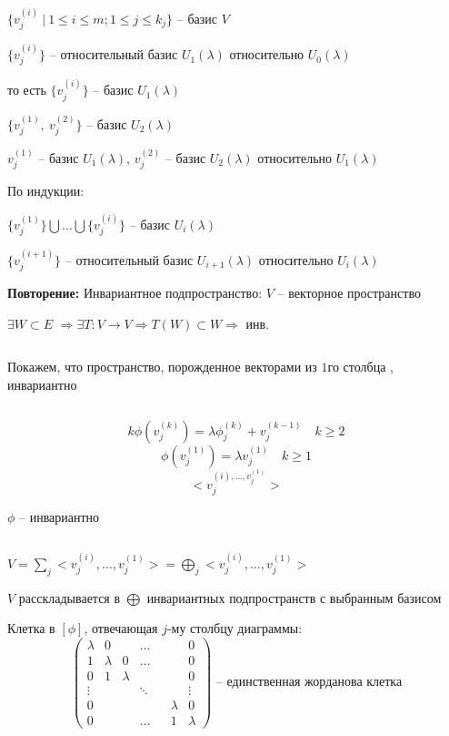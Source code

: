     \begin{illustration*}
        $\{v_j^{(i)} \ | \ 1 \le i \le m; 1 \le j \le k_j \}$ -- базис $V$
        \par \quad $\{v_j^{(i)}\}$ -- относительный базис $U_1(\lambda)$ относительно $U_0(\lambda)$
        \par \quad то есть $\{v_j^{(i)}\}$ -- базис $U_1(\lambda)$
        \par \quad $\{v_j^{(1)}, \ v_j^{(2)}\}$ -- базис $U_2(\lambda)$
        \par \quad $v_j^{(1)}$ -- базис $U_1(\lambda)$, \quad $v_j^{(2)}$ -- базис $U_2(\lambda)$ относительно $U_1(\lambda)$
        \par По индукции:
        \par \quad $\{v_j^{(1)}\} \bigcup \dots \bigcup \{v_j^{(i)}\}$ -- базис $U_i(\lambda)$
        \par \quad $\{v_j^{(i+1)}\}$ -- относительный базис $U_{i+1}(\lambda)$ относительно $U_i(\lambda)$
    \end{illustration*}

    \par \textbf{Повторение:} Инвариантное подпространство: $V$ -- векторное пространство 
    \par $\exists W \subset E$ $\Rightarrow \exists T : V \rightarrow V \Rightarrow T(W) \subset W \Rightarrow$ инв.

    \par $ $
    \par Покажем, что пространство, порожденное векторами из $1$го столбца , инвариантно

    \par $ $ \par {}
    \[
        k\phi(v_j^{(k)}) = \lambda \phi_j^{(k)} + v_j^{(k-1)} \quad k \ge 2
    \]
    \[
        \phi(v_j^{(1)}) = \lambda v_j^{(1)} \quad k \ge 1
    \]
    \[
        <v_j^{(i), \dots, v_j^{(1)}}>    
    \]
    \par $\phi$ -- инвариантно

    \par $ $
    \par $V = \sum_j <v_j^{(i)}, \dots, v_j^{(1)}> = \bigoplus_j <v_j^{(i)}, \dots, v_j^{(1)}>$
    \par $V$ расскладывается в $\bigoplus$ инвариантных подпространств с выбранным базисом
    \par Клетка в $[\phi]$, отвечающая $j$-му столбцу диаграммы:
    \[
        \begin{pmatrix}
            \lambda & 0 & & \dots & & & 0 \\
            1 & \lambda & 0 & \dots & & & 0 \\
            0 & 1 & \lambda & & & & 0 \\
            \vdots & & & \ddots & & & \vdots\\
            0 & & & & & \lambda & 0 \\
            0 & & & \dots & & 1 & \lambda
        \end{pmatrix} \text{ -- единственная жорданова клетка}
    \]

